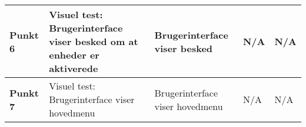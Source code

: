\begin{center}
\begin{longtable}{|p{}|p{}|p{3cm}|p{3cm}|p{3cm}|}
\textbf{Punkt 6}		&Visuel test: Brugerinterface viser besked om at enheder er aktiverede
															&Brugerinterface viser besked 				&N/A &N/A \\\hline
\textbf{Punkt 7}		&Visuel test: Brugerinterface viser hovedmenu
															&Brugerinterface viser hovedmenu 		&N/A &N/A \\\hline
															
	\end{longtable}
	\label{ATUC2} 
\end{center}